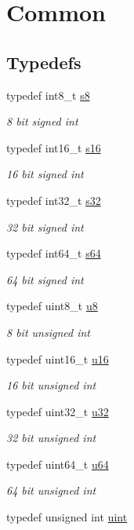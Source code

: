 \hypertarget{group__Common}{}\section{Common}
\label{group__Common}
\subsection*{Typedefs}
\begin{DoxyCompactItemize}
\item 
typedef int8\+\_\+t \hyperlink{group__Common_ga9e382f207c65ca13ab4ae98363aeda80}{s8}
\begin{DoxyCompactList}\small\item\em 8 bit signed int \end{DoxyCompactList}\item 
typedef int16\+\_\+t \hyperlink{group__Common_gaa980e2c02ba2305e0f489d5650655425}{s16}
\begin{DoxyCompactList}\small\item\em 16 bit signed int \end{DoxyCompactList}\item 
typedef int32\+\_\+t \hyperlink{group__Common_gae9b1af5c037e57a98884758875d3a7c4}{s32}
\begin{DoxyCompactList}\small\item\em 32 bit signed int \end{DoxyCompactList}\item 
typedef int64\+\_\+t \hyperlink{group__Common_ga350c6fc928e3bdc6c6486268ac8fb269}{s64}
\begin{DoxyCompactList}\small\item\em 64 bit signed int \end{DoxyCompactList}\item 
typedef uint8\+\_\+t \hyperlink{group__Common_ga92c50087ca0e64fa93fc59402c55f8ca}{u8}
\begin{DoxyCompactList}\small\item\em 8 bit unsigned int \end{DoxyCompactList}\item 
typedef uint16\+\_\+t \hyperlink{group__Common_gace9d960e74685e2cd84b36132dbbf8aa}{u16}
\begin{DoxyCompactList}\small\item\em 16 bit unsigned int \end{DoxyCompactList}\item 
typedef uint32\+\_\+t \hyperlink{group__Common_gafaa62991928fb9fb18ff0db62a040aba}{u32}
\begin{DoxyCompactList}\small\item\em 32 bit unsigned int \end{DoxyCompactList}\item 
typedef uint64\+\_\+t \hyperlink{group__Common_ga3f7e2bcbb0b4c338f3c4f6c937cd4234}{u64}
\begin{DoxyCompactList}\small\item\em 64 bit unsigned int \end{DoxyCompactList}\item 
typedef unsigned int \hyperlink{group__Common_ga91ad9478d81a7aaf2593e8d9c3d06a14}{uint}
\end{DoxyCompactItemize}
